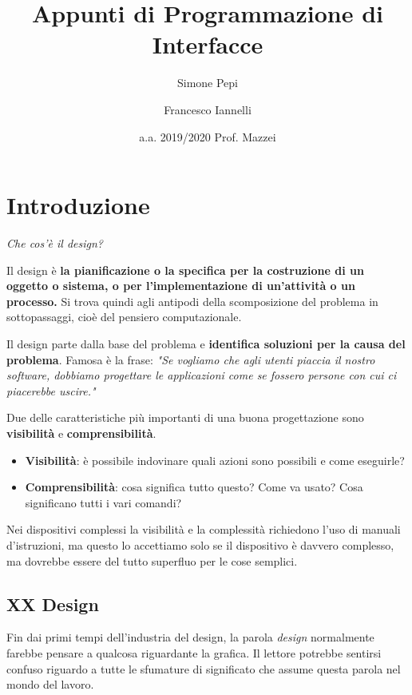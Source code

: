 \documentclass[a4paper,11pt,oneside]{book}
\begin{document}
\title{Appunti di Programmazione di Interfacce}

\author[1]{Simone Pepi}
\author[2]{Francesco Iannelli}
\date{a.a. 2019/2020 Prof. Mazzei}
\maketitle

\tableofcontents

\chapter{Introduzione}
\begin{flushleft}
	\textit{Che cos'è il design?}
\end{flushleft}
Il design è \textbf{la pianificazione o la specifica per la costruzione di un oggetto o sistema, o per l'implementazione di un'attività o un processo.} Si trova quindi agli antipodi della scomposizione del problema in sottopassaggi, cioè del pensiero computazionale.

Il design parte dalla base del problema e \textbf{identifica soluzioni per la causa del problema}.
Famosa è la frase: \textit{"Se vogliamo che agli utenti piaccia il nostro software, dobbiamo progettare le applicazioni come se fossero persone con cui ci piacerebbe uscire."}

Due delle caratteristiche più importanti di una buona progettazione sono \textbf{visibilità} e \textbf{comprensibilità}.

\begin{itemize}
	\item \textbf{Visibilità}: è possibile indovinare quali azioni sono possibili e come eseguirle?
	\item \textbf{Comprensibilità}: cosa significa tutto questo? Come va usato? Cosa significano tutti i vari comandi?
\end{itemize}

Nei dispositivi complessi la visibilità e la complessità richiedono l'uso di manuali d'istruzioni, ma questo lo accettiamo solo se il dispositivo è davvero complesso, ma dovrebbe essere del tutto superfluo per le cose semplici.

\section{XX Design}
Fin dai primi tempi dell'industria del design, la parola \textit{design} normalmente farebbe pensare a qualcosa riguardante la grafica. Il lettore potrebbe sentirsi confuso riguardo a tutte le sfumature di significato che assume questa parola nel mondo del lavoro.
\end{document}
